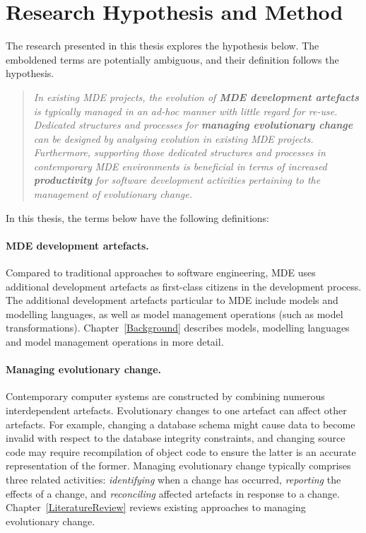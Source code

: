 
\section{Research Hypothesis and Method}
\label{sec:hypothesis}

The research presented in this thesis explores the hypothesis below. The emboldened terms are potentially ambiguous, and their definition follows the hypothesis.

\begin{quote}
\emph{In existing MDE projects, the evolution of \textbf{MDE development artefacts} is typically managed in an ad-hoc manner with little regard for re-use. Dedicated structures and processes for \textbf{managing evolutionary change} can be designed by analysing evolution in existing MDE projects. Furthermore, supporting those dedicated structures and processes in contemporary MDE environments is beneficial in terms of increased \textbf{productivity} for software development activities pertaining to the management of evolutionary change.}
\end{quote}

In this thesis, the terms below have the following definitions:

\paragraph{MDE development artefacts.} Compared to traditional approaches to software engineering, MDE uses additional development artefacts as first-class citizens in the development process. The additional development artefacts particular to MDE include models and modelling languages, as well as model management operations (such as model transformations). Chapter~\ref{Background} describes models, modelling languages and model management operations in more detail.

\paragraph{Managing evolutionary change.} Contemporary computer systems are constructed by combining numerous interdependent artefacts. Evolutionary changes to one artefact can affect other artefacts. For example, changing a database schema might cause data to become invalid with respect to the database integrity constraints, and changing source code may require recompilation of object code to ensure the latter is an accurate representation of the former. Managing evolutionary change typically comprises three related activities: \emph{identifying} when a change has occurred, \emph{reporting} the effects of a change, and \emph{reconciling} affected artefacts in response to a change. Chapter~\ref{LiteratureReview} reviews existing approaches to managing evolutionary change.

